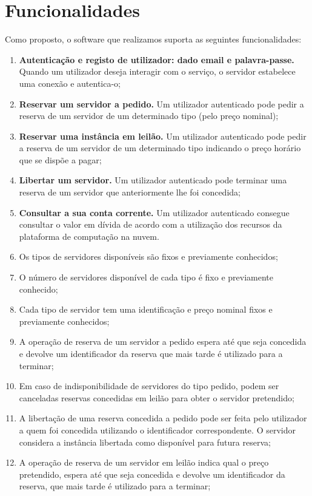 \documentclass[11pt]{article}
\begin{document}
\section{Funcionalidades}
Como proposto, o software que realizamos suporta as seguintes funcionalidades:
\begin{enumerate}
    \item \textbf{Autenticação e registo de utilizador: dado email e palavra-passe.} Quando um utilizador deseja interagir com o serviço, o servidor estabelece uma conexão e autentica-o;
    \item \textbf{Reservar um servidor a pedido.} Um utilizador autenticado pode pedir a reserva de um servidor de um determinado tipo (pelo preço nominal);
    \item \textbf{Reservar uma instância em leilão.} Um utilizador autenticado pode pedir a reserva de um servidor de um determinado tipo indicando o preço horário que se dispõe a pagar;
    \item \textbf{Libertar um servidor.} Um utilizador autenticado pode terminar uma reserva de um servidor que anteriormente lhe foi concedida;
    \item \textbf{Consultar a sua conta corrente.} Um utilizador autenticado consegue consultar o valor em dívida de acordo com a utilização dos recursos da plataforma de computação na nuvem.
    \item Os tipos de servidores disponíveis são fixos e previamente conhecidos;
    \item O número de servidores disponível de cada tipo é fixo e previamente conhecido;
    \item Cada tipo de servidor tem uma identificação e preço nominal fixos e previamente conhecidos;
    \item A operação de reserva de um servidor a pedido espera até que seja concedida e devolve um identificador da reserva que mais tarde é utilizado para a terminar;
    \item Em caso de indisponibilidade de servidores do tipo pedido, podem ser canceladas reservas concedidas em leilão para obter o servidor pretendido;
    \item A libertação de uma reserva concedida a pedido pode ser feita pelo utilizador a quem foi concedida utilizando o identificador correspondente. O servidor considera a instância libertada como disponível para futura reserva;
    \item A operação de reserva de um servidor em leilão indica qual o preço pretendido, espera até que seja concedida e devolve um identificador da reserva, que mais tarde é utilizado para a terminar;

\end{enumerate}
\end{document}
